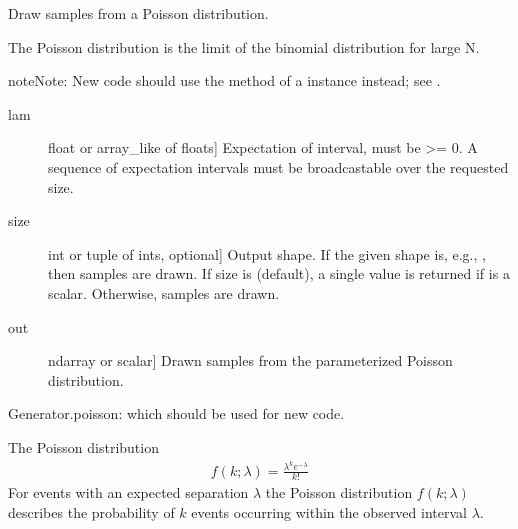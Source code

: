 \documentclass[letterpaper,10pt,english]{sphinxmanual}
\begin{document}
\begin{fulllineitems}
\label{\detokenize{infrapy.utils:infrapy.utils.ref2sac.poisson}}
Draw samples from a Poisson distribution.

The Poisson distribution is the limit of the binomial distribution
for large N.

\begin{sphinxadmonition}{note}{Note:}
New code should use the  method of a 
instance instead; see .
\end{sphinxadmonition}
\begin{description}
\item[{lam}] \leavevmode{[}float or array\_like of floats{]}
Expectation of interval, must be \textgreater{}= 0. A sequence of expectation
intervals must be broadcastable over the requested size.

\item[{size}] \leavevmode{[}int or tuple of ints, optional{]}
Output shape.  If the given shape is, e.g., , then
 samples are drawn.  If size is  (default),
a single value is returned if  is a scalar. Otherwise,
 samples are drawn.

\end{description}
\begin{description}
\item[{out}] \leavevmode{[}ndarray or scalar{]}
Drawn samples from the parameterized Poisson distribution.

\end{description}

Generator.poisson: which should be used for new code.

The Poisson distribution
\begin{equation*}
\begin{split}f(k; \lambda)=\frac{\lambda^k e^{-\lambda}}{k!}\end{split}
\end{equation*}
For events with an expected separation \(\lambda\) the Poisson
distribution \(f(k; \lambda)\) describes the probability of
\(k\) events occurring within the observed
interval \(\lambda\).


\end{fulllineitems}
\end{document}
